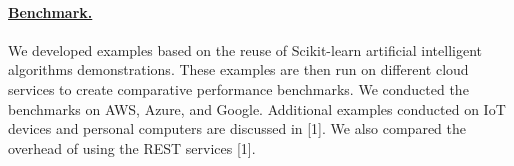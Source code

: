 \paragraph{\underline{Benchmark.}}

We developed examples based on the reuse of Scikit-learn artificial intelligent algorithms demonstrations. These examples are then run on different cloud services to create comparative performance benchmarks. We conducted the benchmarks on 
AWS, Azure, and Google. Additional examples conducted on IoT devices and personal computers are discussed in [1]. We also compared the overhead of using the REST services [1].
